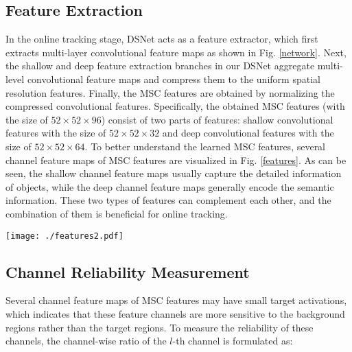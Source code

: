 \documentclass[runningheads]{llncs}
\begin{document}
\subsection{Feature Extraction}
In the online tracking stage, DSNet acts as a feature extractor, which first extracts multi-layer convolutional feature maps as shown in Fig. \ref{network}. Next, the shallow and deep feature extraction branches in our DSNet aggregate multi-level convolutional feature maps and compress them to the uniform spatial resolution features. Finally, the MSC features are obtained by normalizing the compressed convolutional features.  Specifically, the obtained MSC features (with the size of $52\times52\times96$) consist of two parts of features: shallow convolutional features with the size of $52\times52\times32$ and deep convolutional features with the size of $52\times52\times64$. To better understand the learned MSC features, several channel feature maps of MSC features are visualized in Fig. \ref{features}. As can be seen, the shallow channel feature maps usually capture the detailed information of objects, while the deep channel feature maps generally encode the semantic information. These two types of features can complement each other, and the combination of them is beneficial for online tracking.

\begin{figure*}[!tp]
\begin{center}
   \texttt{[image: ./features2.pdf]} %
\end{center}
 \caption{Visualization of the shallow and deep channel feature maps in the learned MSC features. }
\label{features}
\end{figure*}


\subsection{Channel Reliability Measurement}

Several channel feature maps of MSC features may have small target activations, which indicates that these feature channels are more sensitive to the background regions rather than the target regions. To measure the reliability of these channels, the channel-wise ratio of the $l$-th channel is formulated as:
\end{document}
